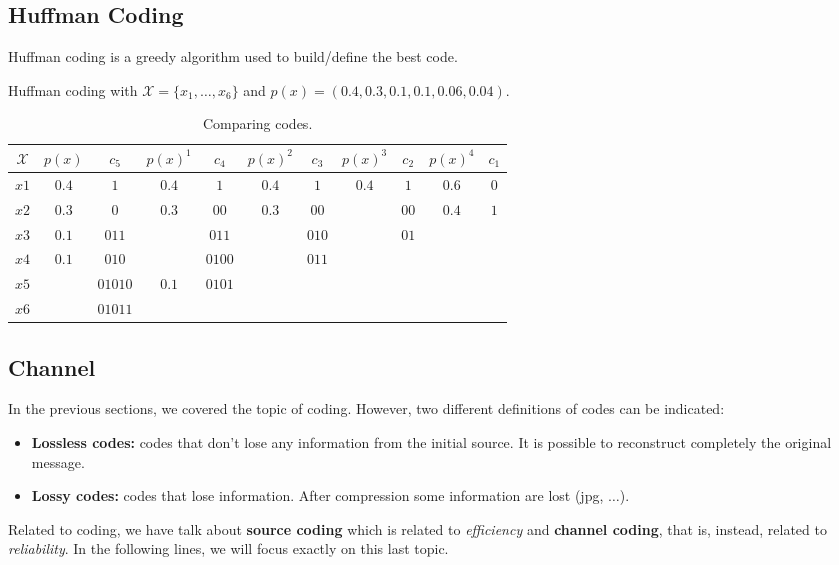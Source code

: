 \subsection{Huffman Coding}
Huffman coding is a greedy algorithm used to build/define the best code. 
\begin{exmp} Huffman coding with $\mathcal{X} = \{x_1, \dots, x_6\}$ and $p(x) = (0.4,0.3,0.1,0.1,0.06,0.04)$.
	
	\begin{table}[H]
		\centering
		\begin{tabular}{| c | c | c | c | c | c | c | c | c | c | c |}
			\hline
			$\mathcal{X}$ & $p(x)$ & $c_5$ & $p(x)^1$ & $c_4$ & $p(x)^2$ & $c_3$ & $p(x)^3$& $c_2$ & $p(x)^4$&$c_1$ \\\hline
			$x1$ & $0.4$ & $1$ & $0.4$ & $1$ & $0.4$ & $1$ & $0.4$& $1$ & $0.6$& $0$ \\
			$x2$ & $0.3$ & $0$ & $0.3$ & $00$ & $0.3$ & $00$ & {\color{red}{*$0.3$}}& $00$ & $0.4$& $1$ \\
			$x3$ & $0.1$ & $011$ & {\color{red}{*$0.1$}} & $011$ & {\color{red}{*$0.2$}} & $010$ & {\color{red}{*$0.3$}}& $01$ & &  \\
			$x4$ & $0.1$ & $010$ & {\color{red}{*$0.1$}} & $0100$ & {\color{red}{*$0.1$}} & $011$ & & & & \\
			$x5$ & {\color{red}{*$0.06$}} & $01010$ & $0.1$ & $0101$ & & & & & &\\
			$x6$ & {\color{red}{*$0.04$}} & $01011$ &  &  &  & & & & & \\
			\hline
		\end{tabular}
		\caption{Comparing codes.}
	\end{table}
\end{exmp}

\subsection{Channel}
In the previous sections, we covered the topic of coding. However, two different definitions of codes can be indicated:
\begin{itemize}
	\item \textbf{Lossless codes:} codes that don't lose any information from the initial source. It is possible to reconstruct completely the original message.
	\item \textbf{Lossy codes:} codes that lose information. After compression some information are lost (jpg, $\dots$).
\end{itemize}
Related to coding, we have talk about \textbf{source coding} which is related to \textit{efficiency} and \textbf{channel coding}, that is, instead, related to \textit{reliability}. In the following lines, we will focus exactly on this last topic. 

